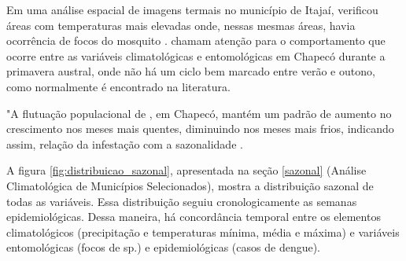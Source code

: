 \indent Em uma análise espacial de imagens termais no município de Itajaí,  verificou áreas com temperaturas mais elevadas onde, nessas mesmas áreas, havia ocorrência de focos do mosquito .  chamam atenção para o comportamento que ocorre entre as variáveis climatológicas e entomológicas em Chapecó durante a primavera austral, onde não há um ciclo bem marcado entre verão e outono, como normalmente é encontrado na literatura.

"A flutuação populacional de , em Chapecó, mantém um padrão de aumento no crescimento nos  meses  mais  quentes,  diminuindo nos  meses  mais  frios,  indicando  assim,  relação  da  infestação com a sazonalidade \cite{Matiola2019ANALISE}.

\indent A figura \ref{fig:distribuicao_sazonal}, apresentada na seção \ref{sazonal} (Análise Climatológica de Municípios Selecionados), mostra a distribuição sazonal de todas as variáveis. Essa distribuição seguiu cronologicamente as semanas epidemiológicas. Dessa maneira, há concordância temporal entre os elementos climatológicos (precipitação e temperaturas mínima, média e máxima) e variáveis entomológicas (focos de  sp.) e epidemiológicas (casos de dengue).

